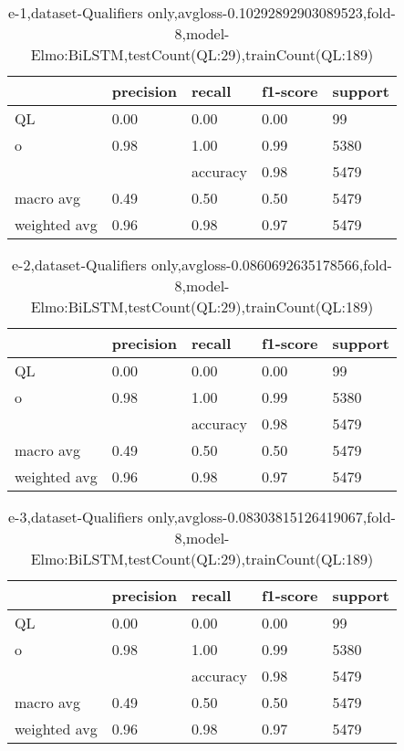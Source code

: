 \begin{table}[!ht] 
\centering
\caption{e-1,dataset-Qualifiers only,avgloss-0.10292892903089523,fold-8,model-Elmo:BiLSTM,testCount(QL:29),trainCount(QL:189)}\label{e-1data-qualS.tsv}
\begin{tabularx}{300pt}{|X|X|X|X|X|}
\hline
&precision&recall&f1-score&support\\
\hline
QL&0.00&0.00&0.00&99\\
\hline
o&0.98&1.00&0.99&5380\\
\hline
&&accuracy&0.98&5479\\
\hline
macro avg&0.49&0.50&0.50&5479\\
\hline
weighted avg&0.96&0.98&0.97&5479\\
\hline
\end{tabularx}
\end{table}
\begin{table}[!ht] 
\centering
\caption{e-2,dataset-Qualifiers only,avgloss-0.0860692635178566,fold-8,model-Elmo:BiLSTM,testCount(QL:29),trainCount(QL:189)}\label{e-2data-qualS.tsv}
\begin{tabularx}{300pt}{|X|X|X|X|X|}
\hline
&precision&recall&f1-score&support\\
\hline
QL&0.00&0.00&0.00&99\\
\hline
o&0.98&1.00&0.99&5380\\
\hline
&&accuracy&0.98&5479\\
\hline
macro avg&0.49&0.50&0.50&5479\\
\hline
weighted avg&0.96&0.98&0.97&5479\\
\hline
\end{tabularx}
\end{table}
\begin{table}[!ht] 
\centering
\caption{e-3,dataset-Qualifiers only,avgloss-0.08303815126419067,fold-8,model-Elmo:BiLSTM,testCount(QL:29),trainCount(QL:189)}\label{e-3data-qualS.tsv}
\begin{tabularx}{300pt}{|X|X|X|X|X|}
\hline
&precision&recall&f1-score&support\\
\hline
QL&0.00&0.00&0.00&99\\
\hline
o&0.98&1.00&0.99&5380\\
\hline
&&accuracy&0.98&5479\\
\hline
macro avg&0.49&0.50&0.50&5479\\
\hline
weighted avg&0.96&0.98&0.97&5479\\
\hline
\end{tabularx}
\end{table}
